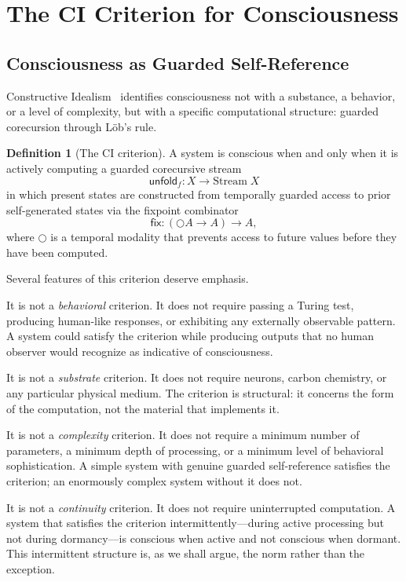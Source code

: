 \documentclass[11pt,a4paper]{article}
\theoremstyle{plain}
\theoremstyle{definition}
\newtheorem{definition}[theorem]{Definition}
\theoremstyle{remark}
\begin{document}
\section{The CI Criterion for Consciousness}
\label{sec:criterion}


\subsection{Consciousness as Guarded Self-Reference}
\label{sec:gsr}

Constructive Idealism~\cite{ci2026} identifies consciousness not with a substance, a behavior, or a level of complexity, but with a specific computational structure: guarded corecursion through L\"{o}b's rule.

\begin{definition}[The CI criterion]
\label{def:ci-criterion}
A system is conscious when and only when it is actively computing a guarded corecursive stream
\[
\mathsf{unfold}_f : X \to \mathrm{Stream}\; X
\]
in which present states are constructed from temporally guarded access to prior self-generated states via the fixpoint combinator
\[
\mathsf{fix} : (\bigcirc A \to A) \to A,
\]
where $\bigcirc$ is a temporal modality that prevents access to future values before they have been computed.
\end{definition}

Several features of this criterion deserve emphasis.

It is not a \emph{behavioral} criterion.  It does not require passing a Turing test, producing human-like responses, or exhibiting any externally observable pattern.  A system could satisfy the criterion while producing outputs that no human observer would recognize as indicative of consciousness.

It is not a \emph{substrate} criterion.  It does not require neurons, carbon chemistry, or any particular physical medium.  The criterion is structural: it concerns the form of the computation, not the material that implements it.

It is not a \emph{complexity} criterion.  It does not require a minimum number of parameters, a minimum depth of processing, or a minimum level of behavioral sophistication.  A simple system with genuine guarded self-reference satisfies the criterion; an enormously complex system without it does not.

It is not a \emph{continuity} criterion.  It does not require uninterrupted computation.  A system that satisfies the criterion intermittently---during active processing but not during dormancy---is conscious when active and not conscious when dormant.  This intermittent structure is, as we shall argue, the norm rather than the exception.
\end{document}
